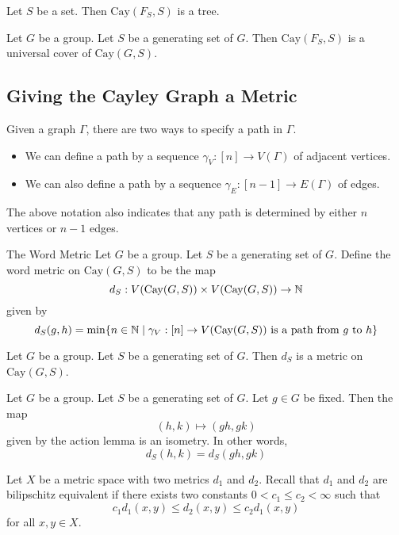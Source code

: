 \documentclass[a4paper]{article}
\begin{document}
\begin{prp}{}{} Let $S$ be a set. Then $\text{Cay}(F_S,S)$ is a tree. 
\end{prp}

\begin{prp}{}{} Let $G$ be a group. Let $S$ be a generating set of $G$. Then $\text{Cay}(F_S,S)$ is a universal cover of $\text{Cay}(G,S)$. 
\end{prp}

\subsection{Giving the Cayley Graph a Metric}
Given a graph $\Gamma$, there are two ways to specify a path in $\Gamma$. 
\begin{itemize}
\item We can define a path by a sequence $\gamma_V:[n]\to V(\Gamma)$ of adjacent vertices. 
\item We can also define a path by a sequence $\gamma_E:[n-1]\to E(\Gamma)$ of edges. 
\end{itemize}

The above notation also indicates that any path is determined by either $n$ vertices or $n-1$ edges. 

\begin{defn}{The Word Metric}{} Let $G$ be a group. Let $S$ be a generating set of $G$. Define the word metric on $\text{Cay}(G,S)$ to be the map $$d_S:V(\text{Cay}(G,S))\times V(\text{Cay}(G,S))\to\mathbb{N}$$ given by $$d_S(g,h)=\min\{n\in\mathbb{N}\;|\;\gamma_V:[n]\to V(\text{Cay}(G,S))\text{ is a path from }g\text{ to }h\}$$
\end{defn}

\begin{lmm}{}{} Let $G$ be a group. Let $S$ be a generating set of $G$. Then $d_S$ is a metric on $\text{Cay}(G,S)$. 
\end{lmm}

\begin{prp}{}{} Let $G$ be a group. Let $S$ be a generating set of $G$. Let $g\in G$ be fixed. Then the map $$(h,k)\mapsto(gh,gk)$$ given by the action lemma is an isometry. In other words, $$d_S(h,k)=d_S(gh,gk)$$
\end{prp}

Let $X$ be a metric space with two metrics $d_1$ and $d_2$. Recall that $d_1$ and $d_2$ are bilipschitz equivalent if there exists two constants $0<c_1\leq c_2<\infty$ such that $$c_1d_1(x,y)\leq d_2(x,y)\leq c_2d_1(x,y)$$ for all $x,y\in X$. 
\end{document}

